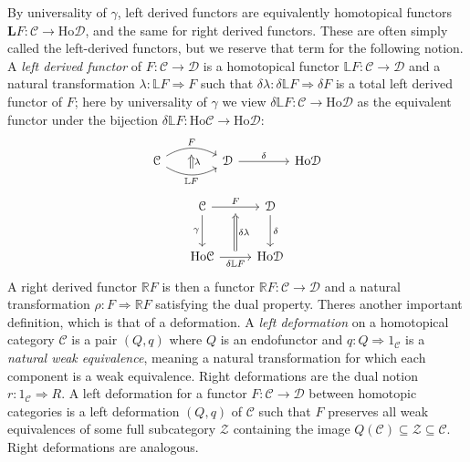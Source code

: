 By universality of $\gamma$, left derived functors are equivalently homotopical functors $\mathbf{L} F : \mathcal{C}  \to \mathrm{Ho} \mathcal{D} $, and the same for right derived functors. These are often simply called the left-derived functors, but we reserve that term for the following notion. A \emph{left derived functor} of $F : \mathcal{C}  \to \mathcal{D} $ is a homotopical functor $\mathbb{L} F : \mathcal{C}  \to \mathcal{D} $ and a natural transformation $\lambda : \mathbb{L} F \Rightarrow F$ such that $\delta\lambda : \delta\mathbb{L} F \Rightarrow \delta F$ is a total left derived functor of $F$; here by universality of $\gamma$ we view $\delta\mathbb{L} F : \mathcal{C}  \to \mathrm{Ho} \mathcal{D} $ as the equivalent functor under the bijection $\delta\mathbb{L} F : \mathrm{Ho} \mathcal{C}  \to \mathrm{Ho} \mathcal{D} $:
\[\begin{tikzcd}[row sep = 2.5em, column sep = 4em]
	\mathcal{C} \ar[" F "{name=F}, bend left, r] \ar[" \mathbb{L} F "'{name=LF}, bend right, r]  & \mathcal{D} \ar[" \delta ", r]  & \mathrm{Ho} \mathcal{D} 
	\arrow[from=LF, to=F, Rightarrow, " \lambda "', shorten=5pt] 
\end{tikzcd}\]
\[\begin{tikzcd}[row sep = 2.5em, column sep = 2.5em]
	\mathcal{C} \ar[" F "{name=F}, r] \ar[" \gamma "', d]  & \mathcal{D} \ar[" \delta ", d]  \\
\mathrm{Ho} \mathcal{C} \ar[" \delta\mathbb{L} F "'{name=dLf}, r]  & \mathrm{Ho} \mathcal{D} 
\arrow[from=dLf, to=F, " \delta\lambda "', Rightarrow, shorten=5pt]
\end{tikzcd}\]
A right derived functor $\mathbb{R} F$ is then a functor $\mathbb{R} F : \mathcal{C}  \to \mathcal{D} $ and a natural transformation $\rho : F \Rightarrow \mathbb{R} F$ satisfying the dual property. Theres another important definition, which is that of a deformation. A \emph{left deformation} on a homotopical category $\mathcal{C} $ is a pair $(Q,q)$ where $Q$ is an endofunctor and $q : Q \Rightarrow 1_\mathcal{C} $ is a \emph{natural weak equivalence}, meaning a natural transformation for which each component is a weak equivalence. Right deformations are the dual notion $r : 1_{\mathcal{C} }  \Rightarrow R$. A left deformation for a functor $F : \mathcal{C}  \to \mathcal{D} $ between homotopic categories is a left deformation $(Q,q)$ of $\mathcal{C} $ such that $F$ preserves all weak equivalences of some full subcategory $\mathcal{Z}$ containing the image $Q(\mathcal{C} )\subseteq \mathcal{Z} \subseteq \mathcal{C} $. Right deformations are analogous.

